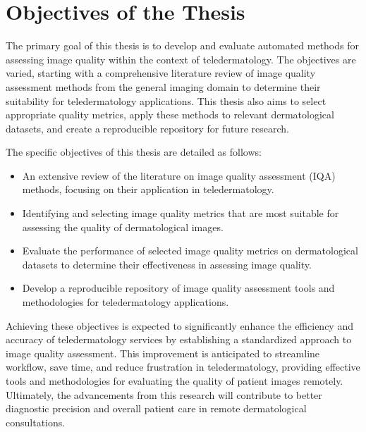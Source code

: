 \section{Objectives of the Thesis}
\label{sec:Objectives}
The primary goal of this thesis is to develop and evaluate automated methods for assessing image quality within the context of teledermatology. The objectives are varied, starting with a comprehensive literature review of image quality assessment methods from the general imaging domain to determine their suitability for teledermatology applications. This thesis also aims to select appropriate quality metrics, apply these methods to relevant dermatological datasets, and create a reproducible repository for future research. \par
\vspace{\baselineskip}
The specific objectives of this thesis are detailed as follows:
\begin{itemize}
    \item An extensive review of the literature on image quality assessment (IQA) methods, focusing on their application in teledermatology.
    \item Identifying and selecting image quality metrics that are most suitable for assessing the quality of dermatological images.
    \item Evaluate the performance of selected image quality metrics on dermatological datasets to determine their effectiveness in assessing image quality.
    \item Develop a reproducible repository of image quality assessment tools and methodologies for teledermatology applications.
\end{itemize}
\noindent
{}Achieving these objectives is expected to significantly enhance the efficiency and accuracy of teledermatology services by establishing a standardized approach to image quality assessment. This improvement is anticipated to streamline workflow, save time, and reduce frustration in teledermatology, providing effective tools and methodologies for evaluating the quality of patient images remotely. Ultimately, the advancements from this research will contribute to better diagnostic precision and overall patient care in remote dermatological consultations. \par

